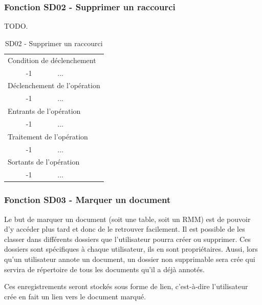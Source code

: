 \documentclass[a4paper]{article}
\begin{document}
\subsubsection{Fonction SD02 - Supprimer un raccourci}
TODO.\\
\begin{table}[H]
  \centering
   \small
	\begin{tabular}{|c|p{12cm}|}
   		\hline
   			\rowcolor{lightgray}\multicolumn{2}{|c|}{\textbf{SD02 - Supprimer un raccourci}} \\
   		\hline
   			\multicolumn{2}{|l|}{Condition de d\'eclenchement} \\
   		\hline
   			-1 & ...\\
   		\hline
   			\multicolumn{2}{|l|}{D\'eclenchement de l'op\'eration} \\
   		\hline
   			-1 & ...\\
   		\hline
   			\multicolumn{2}{|l|}{Entrants de l'op\'eration} \\
   		\hline
   			-1 & ...\\
   		\hline
   			\multicolumn{2}{|l|}{Traitement de l'op\'eration} \\
  		\hline
   			-1 & ...\\
   		\hline
   			\multicolumn{2}{|l|}{Sortants de l'op\'eration} \\
   		\hline
   			-1 & ...\\
   		\hline
	\end{tabular}
  \caption{SD02 - Supprimer un raccourci}
  \normalsize
  \label{tab:supprimer_raccourci}
\end{table}



\subsubsection{Fonction SD03 - Marquer un document}
Le but de marquer un document (soit une table, soit un RMM) est de pouvoir d'y accéder plus tard et donc de le retrouver facilement. Il est possible de les classer dans différents dossiers que l'utilisateur pourra créer ou supprimer. Ces dossiers sont sp\'ecifiques \`a chaque utilisateur, ils en sont propriétaires. Aussi, lors qu'un utilisateur annote un document, un dossier non supprimable sera crée qui servira de répertoire de tous les documents qu'il a déjà annotés. 

Ces enregistrements seront stockés sous forme de lien, c'est-à-dire l'utilisateur crée en fait un lien vers le document marqué.
\end{document}
